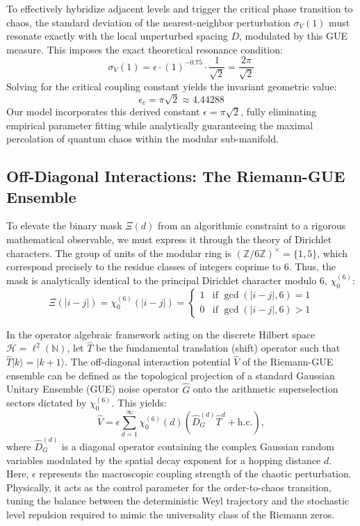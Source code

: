 \documentclass[prl,aps,floatfix,superscriptaddress,10pt]{revtex4-2}
\newcommand{\N}{\mathbb{N}}
\newcommand{\Hilb}{\mathcal{H}}
\newcommand{\Zmod}{\mathbb{Z}/6\mathbb{Z}}
\begin{document}
To effectively hybridize adjacent levels and trigger the critical phase transition to chaos, the standard deviation of the nearest-neighbor perturbation $\sigma_{V}(1)$ must resonate exactly with the local unperturbed spacing $D$, modulated by this GUE measure. This imposes the exact theoretical resonance condition:
\begin{equation}
\sigma_{V}(1) = \epsilon \cdot (1)^{-0.75} \cdot \frac{1}{\sqrt{2}} = \frac{2\pi}{\sqrt{2}}
\end{equation}
Solving for the critical coupling constant yields the invariant geometric value:
\begin{equation}
\epsilon_c = \pi \sqrt{2} \approx 4.44288
\end{equation}
Our model incorporates this derived constant $\epsilon = \pi \sqrt{2}$, fully eliminating empirical parameter fitting while analytically guaranteeing the maximal percolation of quantum chaos within the modular sub-manifold.

\subsection{Off-Diagonal Interactions: The Riemann-GUE Ensemble}

To elevate the binary mask $\Xi(d)$ from an algorithmic constraint to a rigorous mathematical observable, we must express it through the theory of Dirichlet characters.
The group of units of the modular ring is $(\Zmod)^\times = \{1, 5\}$, which correspond precisely to the residue classes of integers coprime to 6. Thus, the mask is analytically identical to the principal Dirichlet character modulo 6, $\chi_0^{(6)}$:
\begin{equation}
\Xi(|i-j|) = \chi_0^{(6)}(|i-j|) = \begin{cases} 
1 & \text{if } \gcd(|i-j|, 6) = 1 \\ 
0 & \text{if } \gcd(|i-j|, 6) > 1 
\end{cases}
\end{equation}

In the operator algebraic framework acting on the discrete Hilbert space $\Hilb = \ell^2(\N)$, let $\hat{T}$ be the fundamental translation (shift) operator such that $\hat{T}|k\rangle = |k+1\rangle$.
The off-diagonal interaction potential $\hat{V}$ of the Riemann-GUE ensemble can be defined as the topological projection of a standard Gaussian Unitary Ensemble (GUE) noise operator $\hat{G}$ onto the arithmetic superselection sectors dictated by $\chi_0^{(6)}$.
This yields:
\begin{equation}
\label{eq:interaction}
\hat{V} = \epsilon \sum_{d=1}^{\infty} \chi_0^{(6)}(d) \left( \hat{D}_G^{(d)} \hat{T}^d + \text{h.c.} \right),
\end{equation}
where $\hat{D}_G^{(d)}$ is a diagonal operator containing the complex Gaussian random variables modulated by the spatial decay exponent for a hopping distance $d$.
Here, $\epsilon$ represents the macroscopic coupling strength of the chaotic perturbation.
Physically, it acts as the control parameter for the order-to-chaos transition, tuning the balance between the deterministic Weyl trajectory and the stochastic level repulsion required to mimic the universality class of the Riemann zeros.
\end{document}
